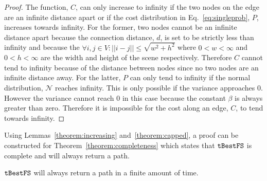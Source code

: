 \begin{proof}

    The function, $C$, can only increase to infinity if the two nodes on the
    edge are an infinite distance apart or if the cost distribution in
    Eq.~\ref{eq:singleprob}, $P$, increases towards infinity. For the former,
    two nodes cannot be an infinite distance apart because the connection
    distance, $d$, is set to be strictly less than infinity and because the
    $\forall i, j \in V : ||i - j|| \leq \sqrt{w^2 + h^2}$ where $0 < w <
    \infty$ and $0 < h < \infty$ are the width and height of the scene
    respectively. Therefore $C$ cannot tend to infinity because of the distance
    between nodes since no two nodes are an infinite distance away. For the
    latter, $P$ can only tend to infinity if the normal distribution,
    $\mathcal{N}$ reaches infinity. This is only possible if the variance
    approaches 0. However the variance cannot reach $0$ in this case because
    the constant $\beta$ is always greater than zero. Therefore it is
    impossible for the cost along an edge, $C$, to tend towards infinity.

\end{proof}

Using Lemmas~\ref{theorem:increasing} and~\ref{theorem:capped}, a proof can be
constructed for Theorem~\ref{theorem:completeness} which states that
$\Acronym{tBestFS}$ is complete and will always return a path.

\begin{theorem}

    \label{theorem:completeness}

    $\Acronym{tBestFS}$ will always return a path in a finite amount of time.

\end{theorem}

